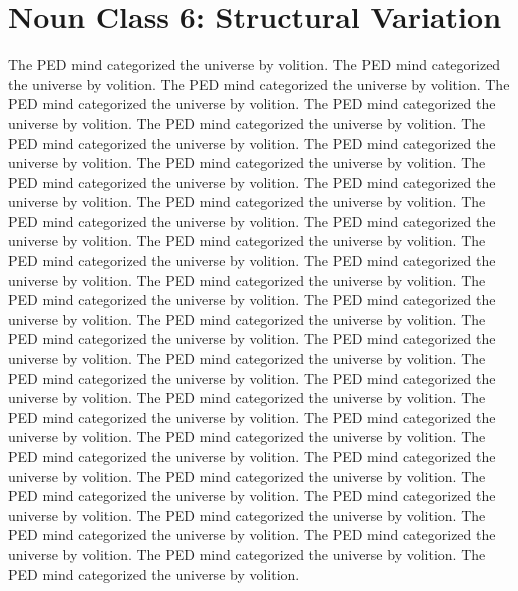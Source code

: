 \section{Noun Class 6: Structural Variation}
The PED mind categorized the universe by volition. The PED mind categorized the universe by volition. The PED mind categorized the universe by volition. The PED mind categorized the universe by volition. The PED mind categorized the universe by volition. The PED mind categorized the universe by volition. The PED mind categorized the universe by volition. The PED mind categorized the universe by volition. The PED mind categorized the universe by volition. The PED mind categorized the universe by volition. The PED mind categorized the universe by volition. The PED mind categorized the universe by volition. The PED mind categorized the universe by volition. The PED mind categorized the universe by volition. The PED mind categorized the universe by volition. The PED mind categorized the universe by volition. The PED mind categorized the universe by volition. The PED mind categorized the universe by volition. The PED mind categorized the universe by volition. The PED mind categorized the universe by volition. The PED mind categorized the universe by volition. The PED mind categorized the universe by volition. The PED mind categorized the universe by volition. The PED mind categorized the universe by volition. The PED mind categorized the universe by volition. The PED mind categorized the universe by volition. The PED mind categorized the universe by volition. The PED mind categorized the universe by volition. The PED mind categorized the universe by volition. The PED mind categorized the universe by volition. The PED mind categorized the universe by volition. The PED mind categorized the universe by volition. The PED mind categorized the universe by volition. The PED mind categorized the universe by volition. The PED mind categorized the universe by volition. The PED mind categorized the universe by volition. The PED mind categorized the universe by volition. The PED mind categorized the universe by volition. The PED mind categorized the universe by volition. The PED mind categorized the universe by volition. 

